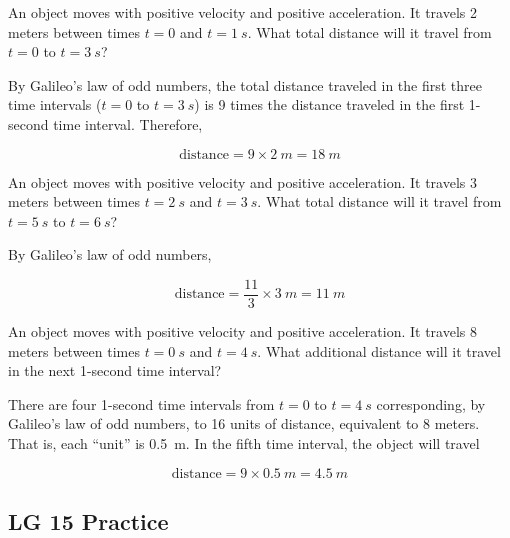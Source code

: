 \documentclass[answers]{exam}
\begin{document}
\begin{questions}
\question
An object moves with positive velocity and positive acceleration. It travels 2 meters between times $t = 0$ and $t = \SI{1}{s}$. What total distance will it travel from $t = 0$ to $t = \SI{3}{s}$?

\begin{solution}
By Galileo's law of odd numbers, the total distance traveled in the first three time intervals ($t = 0$ to $t = \SI{3}{s}$) is 9 times the distance traveled in the first 1-second time interval. Therefore,

\begin{equation*}
    \text{distance} = 9 \times \SI{2}{m} = \boxed{\SI{18}{m}}
\end{equation*}
\end{solution}

\question
An object moves with positive velocity and positive acceleration. It travels 3 meters between times $t = \SI{2}{s}$ and $t = \SI{3}{s}$. What total distance will it travel from $t = \SI{5}{s}$ to $t = \SI{6}{s}$?

\begin{solution}
By Galileo's law of odd numbers,

\begin{equation*}
    \text{distance} = \frac{11}{3} \times \SI{3}{m} = \boxed{\SI{11}{m}} 
\end{equation*}
\end{solution}

\question
An object moves with positive velocity and positive acceleration. It travels 8 meters between times $t = \SI{0}{s}$ and $t = \SI{4}{s}$. What additional distance will it travel in the next 1-second time interval?

\begin{solution}
There are four 1-second time intervals from $t = 0$ to $t = \SI{4}{s}$ corresponding, by Galileo's law of odd numbers, to 16 units of distance, equivalent to 8 meters. That is, each ``unit'' is \SI{0.5}{m}. In the fifth time interval, the object will travel

\begin{equation*}
    \text{distance} = 9 \times \SI{0.5}{m} = \boxed{\SI{4.5}{m}}
\end{equation*}
\end{solution}
\end{questions}

\clearpage

\subsection*{LG 15 Practice}
\end{document}
